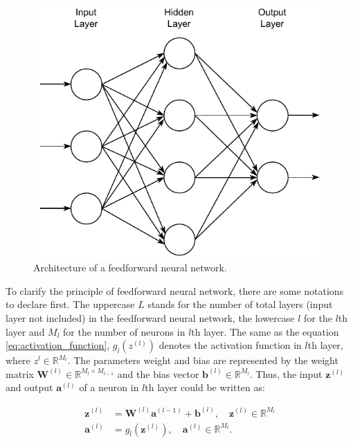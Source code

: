 \documentclass[
	parskip, 			   %
	twoside, 			   %
	DIV=14, 			   %
	BCOR=15.0mm, 		   %
	headsepline, 		   %
	open=right, 		   %
	captions=tableheading, %
	bibliography=totoc,    %
	numbers=noenddot       %
]{scrreprt}
\begin{document}
\begin{figure}[h!]
    \centering
    \includegraphics[scale=1]{figures/feedforward_neural_network.pdf}
    \caption{Architecture of a feedforward neural network.}
    \label{fig:feedforward}
\end{figure}

To clarify the principle of feedforward neural network, there are some notations to declare first. The uppercase $L$ stands for the number of total layers (input layer not included) in the feedforward neural network, the lowercase $l$ for the $l$th layer and $M_{l}$ for the number of neurons in $l$th layer. The same as the equation \ref{eq:activation_function}, $g_{l}(z^{(l)})$ denotes the activation function in $l$th layer, where $z^{l} \in \mathbb{R}^{M_{l}}$. The parameters weight and bias are represented by the weight matrix $\mathbf{W}^{(l)} \in \mathbb{R}^{M_{l} \times M_{l-1}}$ and the bias vector $\mathbf{b}^{(l)} \in \mathbb{R}^{M_{l}}$. Thus, the input $\mathbf{z}^{(l)}$ and output $\mathbf{a}^{(l)}$ of a neuron in $l$th layer could be written as:

\begin{equation}
    \label{eq:input_output_neuron}
    \begin{aligned}
    \mathbf{z}^{(l)} &= \mathbf{W}^{(l)} \mathbf{a}^{(l-1)} + \mathbf{b}^{(l)}, \quad \mathbf{z}^{(l)} \in \mathbb{R}^{M_{l}}\\
    \mathbf{a}^{(l)} &= g_{l}(\mathbf{z}^{(l)}), \quad \mathbf{a}^{(l)} \in \mathbb{R}^{M_{l}}.
    \end{aligned}
\end{equation}
\end{document}
